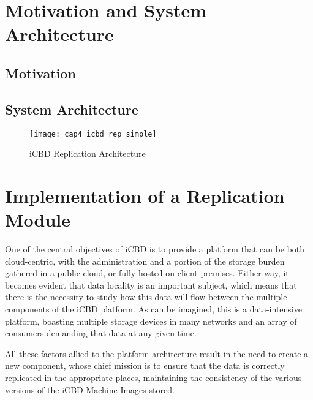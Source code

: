 \section{Motivation and System Architecture}
\label{sec:impl_mot_sysarch}

\subsection{Motivation}
\label{sub:impl_mot}

\subsection{System Architecture}
\label{sub:impl_sysarch}

\begin{figure}[htbp]
    \centering
    \texttt{[image: cap4\_icbd\_rep\_simple]}
    \caption{iCBD Replication Architecture}
    \label{fig:icbd_rep_ar ch}
\end{figure}

\section{Implementation of a Replication Module}
\label{sec:impl_icbdrep}

One of the central objectives of iCBD is to provide a platform that can be both cloud-centric, with the administration and a portion of the storage burden gathered in a public cloud, or fully hosted on client premises. Either way, it becomes evident that data locality is an important subject, which means that there is the necessity to study how this data will flow between the multiple components of the iCBD platform.
As can be imagined, this is a data-intensive platform, boasting multiple storage devices in many networks and an array of consumers demanding that data at any given time.

All these factors allied to the platform architecture result in the need to create a new component, whose chief mission is to ensure that the data is correctly replicated in the appropriate places, maintaining the consistency of the various versions of the iCBD Machine Images stored.



